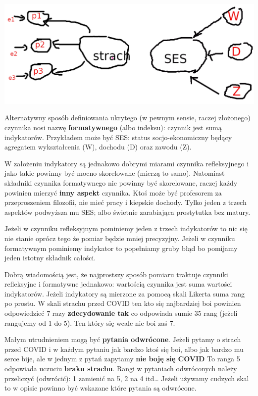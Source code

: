 \documentclass[
  openany]{book}
\begin{document}
\includegraphics{./pomiar_ses-cropped.png}

Alternatywny sposób definiowania ukrytego (w pewnym sensie, raczej złożonego)
czynnika nosi nazwę \textbf{formatywnego} (albo indeksu): czynnik jest sumą indykatorów.
Przykładem może być SES:
status socjo-ekonomiczny będący agregatem wykształcenia (W), dochodu (D)
oraz zawodu (Z).

W założeniu indykatory są jednakowo dobrymi miarami
czynnika refleksyjnego i jako takie powinny być mocno
skorelowane (mierzą to samo).
Natomiast składniki czynnika formatywnego nie powinny
być skorelowane, raczej każdy powinien mierzyć \textbf{inny
aspekt} czynnika. Ktoś może być profesorem
za przeproszeniem filozofii, nie mieć pracy i kiepskie
dochody.
Tylko jeden z trzech aspektów podwyższa mu SES;
albo świetnie zarabiająca prostytutka bez matury.

Jeżeli w czynniku refleksyjnym pominiemy jeden z trzech indykatorów to nic się
nie stanie oprócz tego że pomiar będzie mniej precyzyjny. Jeżeli
w czynniku formatywnym pominiemy indykator to popełniamy gruby błąd bo pomijamy
jeden istotny składnik całości.

Dobrą wiadomością jest, że najprostszy sposób pomiaru traktuje czynniki
refleksyjne i formatywne jednakowo: wartością czynnika jest suma
wartości indykatorów. Jeżeli indykatory są mierzone za pomocą skali Likerta
suma rang po prostu. W skali strachu przed COVID ten kto się najbardziej
boi powinien odpowiedzieć 7 razy \textbf{zdecydowanie tak} co odpowiada
sumie 35 rang (jeżeli rangujemy od 1 do 5).
Ten który się wcale nie boi zaś 7.

Małym utrudnieniem mogą być \textbf{pytania odwrócone}. Jeżeli pytamy
o strach przed COVID i w każdym pytaniu jak bardzo ktoś się boi, albo jak
bardzo mu serce bije, ale w jednym z pytań zapytamy \textbf{nie boję się COVID}
To ranga 5 odpowiada uczuciu \textbf{braku strachu}. Rangi w pytaniach odwróconych
należy przeliczyć (odwrócić): 1 zamienić na 5, 2 na 4 itd\ldots{}
Jeżeli używamy cudzych skal to w opisie powinno być wskazane które
pytania są odwrócone.
\end{document}
